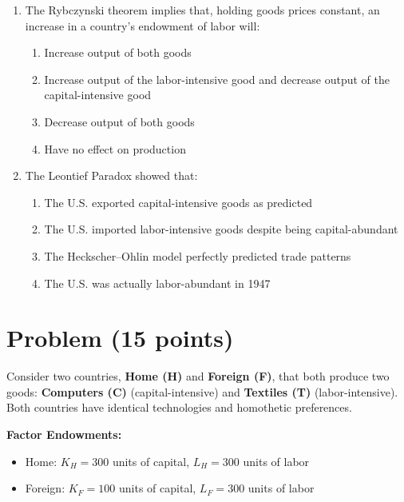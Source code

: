 \documentclass[12pt]{article}
\begin{document}
\begin{enumerate}
    \item The Rybczynski theorem implies that, holding goods prices constant, an increase in a country's endowment of labor will:  
    \begin{enumerate}
        \item Increase output of both goods  
        \item Increase output of the labor-intensive good and decrease output of the capital-intensive good  
        \item Decrease output of both goods  
        \item Have no effect on production  
    \end{enumerate}

    \item The Leontief Paradox showed that:  
    \begin{enumerate}
        \item The U.S. exported capital-intensive goods as predicted  
        \item The U.S. imported labor-intensive goods despite being capital-abundant  
        \item The Heckscher--Ohlin model perfectly predicted trade patterns  
        \item The U.S. was actually labor-abundant in 1947  
    \end{enumerate}
\end{enumerate}

\vspace{0.5cm}
\newpage
\section*{Problem (15 points)}

\noindent Consider two countries, \textbf{Home (H)} and \textbf{Foreign (F)}, that both produce two goods: \textbf{Computers (C)} (capital-intensive) and \textbf{Textiles (T)} (labor-intensive). Both countries have identical technologies and homothetic preferences.

\vspace{0.4cm}

\noindent \textbf{Factor Endowments:}
\begin{itemize}
    \item Home: $K_H = 300$ units of capital, $L_H = 300$ units of labor
    \item Foreign: $K_F = 100$ units of capital, $L_F = 300$ units of labor
\end{itemize}
\end{document}
